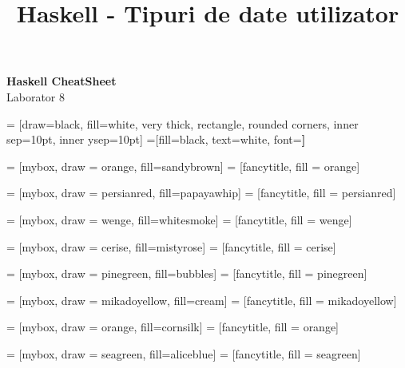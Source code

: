 \documentclass[a4paper]{article}
\title{Haskell - Tipuri de date utilizator}
\begin{document}
\begin{center}{\huge{\textbf{Haskell CheatSheet}}}\\
{\large Laborator 8}
\end{center}

\begin{multicols*}{3}

 = [draw=black, fill=white, very thick,
    rectangle, rounded corners, inner sep=10pt, inner ysep=10pt]
 =[fill=black, text=white, font=\bfseries]

 = [mybox, draw = orange, fill=sandybrown]
 = [fancytitle, fill = orange]


 = [mybox, draw = persianred, fill=papayawhip]
 = [fancytitle, fill = persianred]

 = [mybox, draw = wenge, fill=whitesmoke]
 = [fancytitle, fill = wenge]

 = [mybox, draw = cerise, fill=mistyrose]
 = [fancytitle, fill = cerise]

 = [mybox, draw = pinegreen, fill=bubbles]
 = [fancytitle, fill = pinegreen]

 = [mybox, draw = mikadoyellow, fill=cream]
 = [fancytitle, fill = mikadoyellow]

 = [mybox, draw = orange, fill=cornsilk]
 = [fancytitle, fill = orange]

 = [mybox, draw = seagreen, fill=aliceblue]
 = [fancytitle, fill = seagreen]


\end{multicols*}
\end{document}
